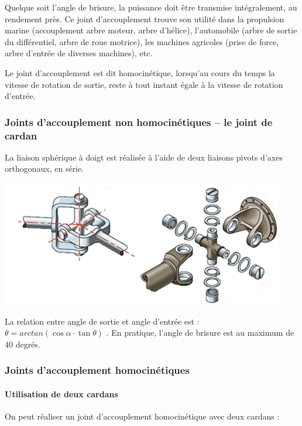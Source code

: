 \documentclass[11pt,oneside]{article}
\begin{document}
Quelque soit l’angle de brisure, la puissance doit être transmise intégralement, au rendement près.
Ce joint d’accouplement trouve son utilité dans la propulsion marine (accouplement arbre moteur, arbre d’hélice), l’automobile (arbre de sortie du différentiel, arbre de roue motrice), les machines agricoles (prise de force, arbre d’entrée de diverses machines), etc.

Le joint d’accouplement est dit homocinétique, lorsqu’au cours du temps la vitesse de rotation de sortie, reste à tout instant égale à la vitesse de rotation d’entrée.

\subsubsection{Joints d’accouplement non homocinétiques -- le joint de cardan}
La liaison sphérique à doigt est réalisée à l’aide de deux liaisons pivots d’axes orthogonaux, en série.

\begin{center}
\includegraphics[height=5.5cm]{png/fig_35}
\end{center}


La relation entre angle de sortie et angle d’entrée est : $\theta=arctan \left( \cos \alpha \cdot \tan \theta \right)$ . En pratique, l’angle de brisure est au maximum de 40 degrés.

\subsubsection{Joints d’accouplement homocinétiques}

\paragraph{Utilisation de deux cardans}
On peut réaliser un joint d’accouplement homocinétique avec deux cardans :
\end{document}
